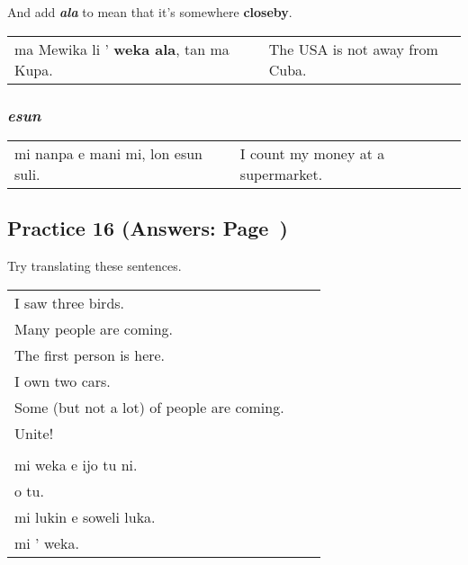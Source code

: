 And add \textbf{\textit{ala}} to mean that it's somewhere \textbf{closeby}. 

\begin{supertabular}{p{5,5cm}|ll}
ma Mewika li ' \textbf{weka ala}, tan ma Kupa. && The USA is not away from Cuba. \\
\end{supertabular} 

\subsubsection*{\textit{esun}}

\begin{supertabular}{p{5,5cm}|ll}
mi nanpa e mani mi, lon esun suli. && I count my money at a supermarket. \\
\end{supertabular}
%
\subsection*{Practice 16 (Answers: Page~\pageref{'numbers'})}
%
Try translating these sentences.

\begin{supertabular}{p{5,5cm}|ll}
I saw three birds.    \\ %
Many people are coming. \\   %
The first person is here. \\   %
I own two cars.   \\ %
Some (but not a lot) of people are coming. \\  %
Unite!    \\ %
 && \\ %
mi weka e ijo tu ni.   \\ %
o tu.   \\ %
mi lukin e soweli luka. \\   %
mi ' weka.   \\ %
\end{supertabular}
